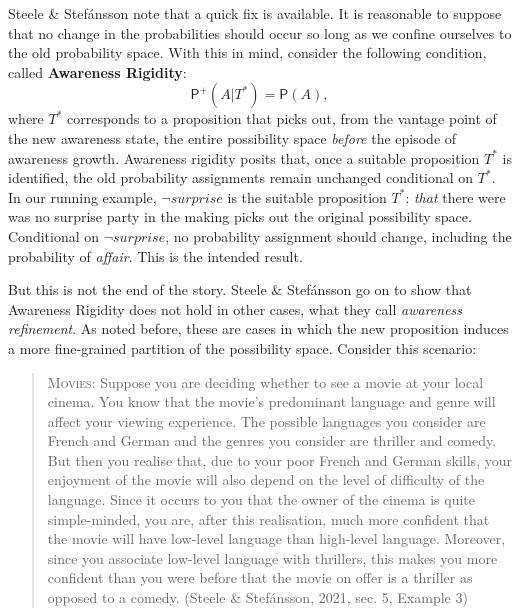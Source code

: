 \documentclass[
  11pt,
  dvipsnames,enabledeprecatedfontcommands]{scrartcl}
\newcommand{\pr}[1]{\ensuremath{\mathsf{P}(#1)}}
\newcommand{\ppr}[2]{\ensuremath{\mathsf{P}^{#1}(#2)}}
\begin{document}
Steele \& Stefánsson note that a quick fix is available. It is
reasonable to suppose that no change in the probabilities should occur
so long as we confine ourselves to the old probability space. With this
in mind, consider the following condition, called
\textbf{Awareness Rigidity}: \[\ppr{+}{A \vert T^*}=\pr{A},\] where
\(T^*\) corresponds to a proposition that picks out, from the vantage
point of the new awareness state, the entire possibility space
\emph{before} the episode of awareness growth. Awareness rigidity posits
that, once a suitable proposition \(T^*\) is identified, the old
probability assignments remain unchanged conditional on \(T^*\). In our
running example, \(\neg\textit{surprise}\) is the suitable proposition
\(T^*\): \emph{that} there were was no surprise party in the making
picks out the original possibility space. Conditional on
\(\neg\textit{surprise}\), no probability assignment should change,
including the probability of \textit{affair}. This is the intended
result.

But this is not the end of the story. Steele \& Stefánsson go on to show
that Awareness Rigidity does not hold in other cases, what they call
\emph{awareness refinement}. As noted before, these are cases in which
the new proposition induces a more fine-grained partition of the
possibility space. Consider this scenario:

\begin{quote}
\textsc{Movies}: Suppose you are deciding whether to see a movie at your
local cinema. You know that the movie's predominant language and genre
will affect your viewing experience. The possible languages you consider
are French and German and the genres you consider are thriller and
comedy. But then you realise that, due to your poor French and German
skills, your enjoyment of the movie will also depend on the level of
difficulty of the language. Since it occurs to you that the owner of the
cinema is quite simple-minded, you are, after this realisation, much
more confident that the movie will have low-level language than
high-level language. Moreover, since you associate low-level language
with thrillers, this makes you more confident than you were before that
the movie on offer is a thriller as opposed to a comedy. (Steele \&
Stefánsson, 2021, sec. 5, Example 3)
\end{quote}

\doublespace
\end{document}
